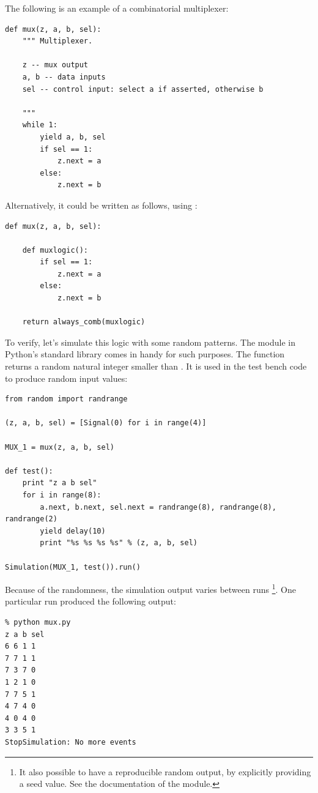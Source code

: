 The following is an example of a combinatorial multiplexer:

\begin{verbatim}
def mux(z, a, b, sel):
    """ Multiplexer.
    
    z -- mux output
    a, b -- data inputs
    sel -- control input: select a if asserted, otherwise b

    """
    while 1:
        yield a, b, sel
        if sel == 1:
            z.next = a
        else:
            z.next = b
\end{verbatim}

Alternatively, it could be written as follows, using
:

\begin{verbatim}
def mux(z, a, b, sel):

    def muxlogic():
        if sel == 1:
            z.next = a
        else:
            z.next = b

    return always_comb(muxlogic)
\end{verbatim}

To verify, let's simulate this logic with some random patterns. The
 module in Python's standard library comes in handy for
such purposes. The function  returns a random
natural integer smaller than . It is used in the test bench
code to produce random input values:

\begin{verbatim}
from random import randrange

(z, a, b, sel) = [Signal(0) for i in range(4)]

MUX_1 = mux(z, a, b, sel)

def test():
    print "z a b sel"
    for i in range(8):
        a.next, b.next, sel.next = randrange(8), randrange(8), randrange(2)
        yield delay(10)
        print "%s %s %s %s" % (z, a, b, sel)
        
Simulation(MUX_1, test()).run() 
\end{verbatim}

Because of the randomness, the simulation output varies between runs
\footnote{It also possible to have a reproducible random output, by
explicitly providing a seed value. See the documentation of the
 module.}. One particular run produced the following
output:

\begin{verbatim}
% python mux.py
z a b sel
6 6 1 1
7 7 1 1
7 3 7 0
1 2 1 0
7 7 5 1
4 7 4 0
4 0 4 0
3 3 5 1
StopSimulation: No more events
\end{verbatim}


